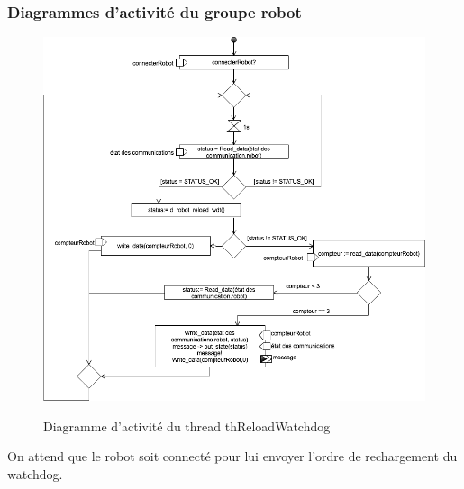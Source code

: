 \documentclass[11pt, a4paper]{paper}
\begin{document}
\subsubsection{Diagrammes d'activité du groupe robot}

\begin{figure}[htbp]
\label{fig:act_communiquer}
\begin{center}
{\includegraphics[scale=.4]{./figures/watchdog}}
{\caption{Diagramme d'activité du thread thReloadWatchdog}}
\end{center}
\end{figure}
{\color{black}On attend que le robot soit connecté pour lui envoyer l'ordre de rechargement du watchdog.}
\end{document}
